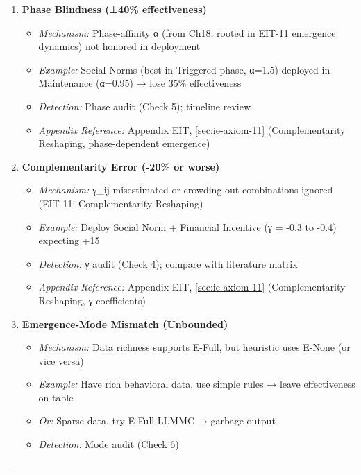 \begin{enumerate}
\item \textbf{Phase Blindness (±40\% effectiveness)}
  \begin{itemize}[nosep]
  \item \textit{Mechanism:} Phase-affinity α (from Ch18, rooted in EIT-11 emergence dynamics) not honored in deployment
  \item \textit{Example:} Social Norms (best in Triggered phase, α=1.5) deployed in Maintenance (α=0.95) → lose 35\% effectiveness
  \item \textit{Detection:} Phase audit (Check 5); timeline review
  \item \textit{Appendix Reference:} Appendix EIT, \ref{sec:ie-axiom-11} (Complementarity Reshaping, phase-dependent emergence)
  \end{itemize}

\item \textbf{Complementarity Error (-20\% or worse)}
  \begin{itemize}[nosep]
  \item \textit{Mechanism:} γ_ij misestimated or crowding-out combinations ignored (EIT-11: Complementarity Reshaping)
  \item \textit{Example:} Deploy Social Norm + Financial Incentive (γ = -0.3 to -0.4) expecting +15%
  \item \textit{Detection:} γ audit (Check 4); compare with literature matrix
  \item \textit{Appendix Reference:} Appendix EIT, \ref{sec:ie-axiom-11} (Complementarity Reshaping, γ coefficients)
  \end{itemize}

\item \textbf{Emergence-Mode Mismatch (Unbounded)}
  \begin{itemize}[nosep]
  \item \textit{Mechanism:} Data richness supports E-Full, but heuristic uses E-None (or vice versa)
  \item \textit{Example:} Have rich behavioral data, use simple rules → leave effectiveness on table
  \item \textit{Or:} Sparse data, try E-Full LLMMC → garbage output
  \item \textit{Detection:} Mode audit (Check 6)
  \end{itemize}
\end{enumerate}

---

